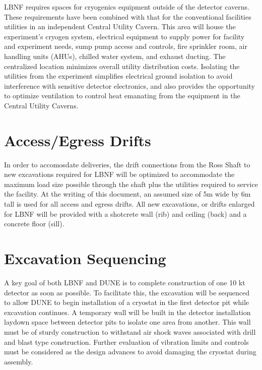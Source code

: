 LBNF requires spaces for cryogenics equipment outside of the detector caverns. These requirements have been combined with that for the conventional facilities utilities in an independent Central Utility Cavern. This area will house the experiment's cryogen system, electrical equipment to supply power for facility and experiment needs, sump pump access and controls, fire sprinkler room, air handling units (AHUs), chilled water system, and exhaust ducting. The centralized location minimizes overall utility distribution costs.  Isolating the utilities from the experiment simplifies electrical ground isolation to avoid interference with sensitive detector electronics, and also provides the opportunity to optimize ventilation to control heat emanating from the equipment in the Central Utility Caverns.

\section{Access/Egress Drifts}
\label{sec:fscf-excav-access-drifts}

In order to accomosdate deliveries, the drift connections from the Ross Shaft to new excavations required for LBNF will be optimized to accommodate the maximum load size possible through the shaft plus the utilities required to service the facility.  At the writing of this document, an assumed size of 5m wide by 6m tall is used for all access and egress drifts.  All new excavations, or drifts enlarged for LBNF will be provided with a shotcrete wall (rib) and ceiling (back) and a concrete floor (sill).

\section{Excavation Sequencing}
\label{sec:fscf-excav-exc-seq}

A key goal of both LBNF and DUNE is to complete construction of one 10 kt detector as soon as possible.  To facilitate this, the excavation will be sequenced to allow DUNE to begin installation of a cryostat in the first detector pit while excavation continues.  A temporary wall will be built in the detector installation laydown space between detector pits to isolate one area from another.  This wall must be of sturdy construction to withstand air shock waves associated with drill and blast type construction.  Further evaluation of vibration limits and controls must be considered as the design advances to avoid damaging the cryostat during assembly.

